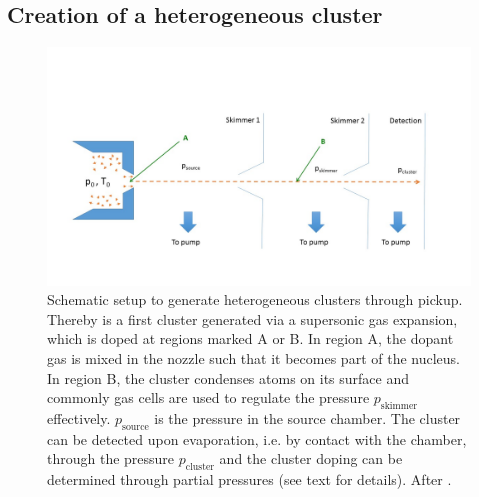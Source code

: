 \subsection{Creation of a heterogeneous cluster}
\begin{figure}
	\centering
		\includegraphics[width=1.00\textwidth]{images/pick-up.jpg}
	\caption[Schematic of a pickup (gas-)source.]{Schematic setup to generate heterogeneous clusters through pickup. Thereby is a first cluster generated via a supersonic gas expansion, which is doped at regions marked A or B. In region A, the dopant gas is mixed in the nozzle such that it becomes part of the nucleus. In region B, the cluster condenses atoms on its surface and commonly gas cells are used to regulate the pressure $p_{\text{skimmer}}$ effectively. $p_{\text{source}}$ is the pressure in the source chamber. The cluster can be detected upon evaporation, i.e. by contact with the chamber, through the pressure $p_{\text{cluster}}$ and the cluster doping can be determined through partial pressures (see text for details). After \cite{Gough-1985-JChemPhys,Haberland-1994-Springer}.}
	\label{fig:pickupPrinciple}
\end{figure}
